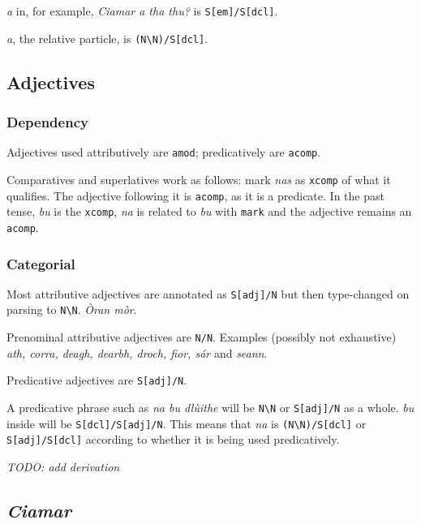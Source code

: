 \documentclass[a4paper]{article}
\begin{document}
 \textit{a} in, for example, \textit{Ciamar a tha thu?} is \texttt{S[em]/S[dcl]}.

 \textit{a}, the relative particle, is \texttt{(N\textbackslash N)/S[dcl]}.

\subsection{Adjectives}

\subsubsection{Dependency}

 Adjectives used attributively are \texttt{amod}; predicatively are \texttt{acomp}.

 Comparatives and superlatives work as follows: mark \textit{nas} as \texttt{xcomp} of what it qualifies. The adjective following it is \texttt{acomp}, as it is a predicate. In the past tense, \textit{bu} is the \texttt{xcomp}, \textit{na} is related to \textit{bu} with \texttt{mark} and the adjective remains an \texttt{acomp}.

\subsubsection{Categorial}

 Most attributive adjectives are annotated as \texttt{S[adj]/N} but then type-changed on parsing to \texttt{N\textbackslash N}. \textit{\`Oran m\`or}.

 Prenominal attributive adjectives are \texttt{N/N}. Examples (possibly not exhaustive) \textit{ath, corra, deagh, dearbh, droch, fior, s\'ar} and \textit{seann}.

 Predicative adjectives are \texttt{S[adj]/N}.

 A predicative phrase such as \textit{na bu dl\`uithe} will be \texttt{N\textbackslash N} or \texttt{S[adj]/N} as a whole. \textit{bu} inside will be \texttt{S[dcl]/S[adj]/N}. This means that \textit{na} is \texttt{(N\textbackslash N)/S[dcl]} or \texttt{S[adj]/S[dcl]} according to whether it is being used predicatively.

\textit{TODO: add derivation}

\subsection{\textit{Ciamar}}
\end{document}
